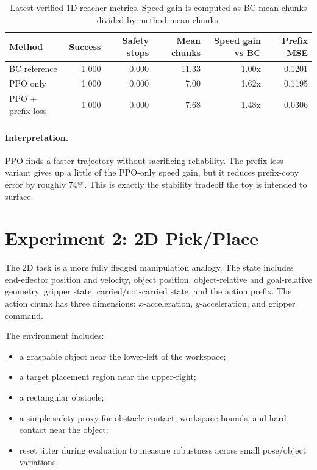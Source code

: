 \documentclass[11pt]{article}
\begin{document}
\begin{table}[H]
\centering
\begin{tabular}{lrrrrr}
\toprule
Method & Success & Safety stops & Mean chunks & Speed gain vs BC & Prefix MSE \\
\midrule
BC reference & 1.000 & 0.000 & 11.33 & 1.00x & 0.1201 \\
PPO only & 1.000 & 0.000 & 7.00 & 1.62x & 0.1195 \\
PPO + prefix loss & 1.000 & 0.000 & 7.68 & 1.48x & 0.0306 \\
\bottomrule
\end{tabular}
\caption{Latest verified 1D reacher metrics. Speed gain is computed as BC mean chunks divided by method mean chunks.}
\end{table}

\paragraph{Interpretation.}
PPO finds a faster trajectory without sacrificing reliability. The prefix-loss variant gives up a little of the PPO-only speed gain, but it reduces prefix-copy error by roughly 74\%. This is exactly the stability tradeoff the toy is intended to surface.

\section{Experiment 2: 2D Pick/Place}

The 2D task is a more fully fledged manipulation analogy. The state includes end-effector position and velocity, object position, object-relative and goal-relative geometry, gripper state, carried/not-carried state, and the action prefix. The action chunk has three dimensions: \(x\)-acceleration, \(y\)-acceleration, and gripper command.

The environment includes:
\begin{itemize}[leftmargin=1.5em]
  \item a graspable object near the lower-left of the workspace;
  \item a target placement region near the upper-right;
  \item a rectangular obstacle;
  \item a simple safety proxy for obstacle contact, workspace bounds, and hard contact near the object;
  \item reset jitter during evaluation to measure robustness across small pose/object variations.
\end{itemize}
\end{document}
